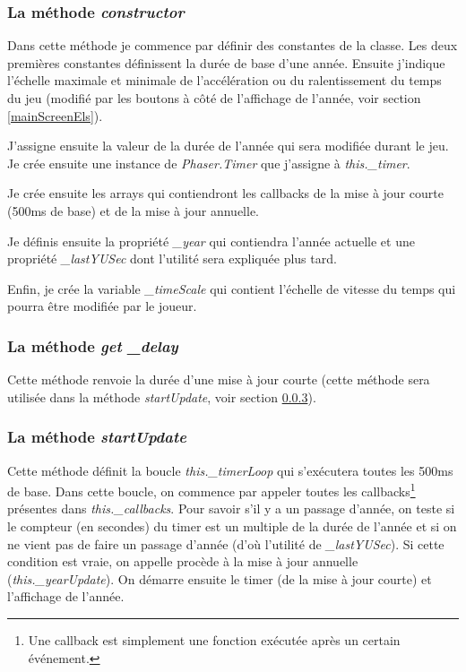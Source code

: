 \documentclass{article}
\begin{document}
		\subsubsection{La méthode \textit{constructor}}
		Dans cette méthode je commence par définir des constantes de la classe. Les deux premières constantes définissent la durée de base d'une année. Ensuite j'indique l'échelle maximale et minimale de l'accélération ou du ralentissement du temps du jeu (modifié par les boutons à côté de l'affichage de l'année, voir section \ref{mainScreenEls}).
		
		
		J'assigne ensuite la valeur de la durée de l'année qui sera modifiée durant le jeu. Je crée ensuite une instance de \textit{Phaser.Timer} que j'assigne à \textit{this.\_timer}.
		
		Je crée ensuite les arrays qui contiendront les callbacks de la mise à jour courte (500ms de base) et de la mise à jour annuelle. 
		
		
		Je définis ensuite la propriété \textit{\_year} qui contiendra l'année actuelle et une propriété \textit{\_lastYUSec} dont l'utilité sera expliquée plus tard.
		
		
		Enfin, je crée la variable \textit{\_timeScale} qui contient l'échelle de vitesse du temps qui pourra être modifiée par le joueur.
		
		\subsubsection{La méthode \textit{get \_delay}}
		Cette méthode renvoie la durée d'une mise à jour courte (cette méthode sera utilisée dans la méthode \textit{startUpdate}, voir section \ref{startUpdate}).
		
		\subsubsection{La méthode \textit{startUpdate}} \label{startUpdate}
		Cette méthode définit la boucle \textit{this.\_timerLoop} qui s'exécutera toutes les 500ms de base. Dans cette boucle, on commence par appeler toutes les callbacks\footnote{Une callback est simplement une fonction exécutée après un certain événement.} présentes dans \textit{this.\_callbacks}. 
		Pour savoir s'il y a un passage d'année, on teste si le compteur (en secondes) du timer est un multiple de la durée de l'année et si on ne vient pas de faire un passage d'année (d'où l'utilité de \textit{\_lastYUSec}). Si cette condition est vraie, on appelle procède à la mise à jour annuelle (\textit{this.\_yearUpdate}).
		On démarre ensuite le timer (de la mise à jour courte) et l'affichage de l'année.
		
\end{document}
